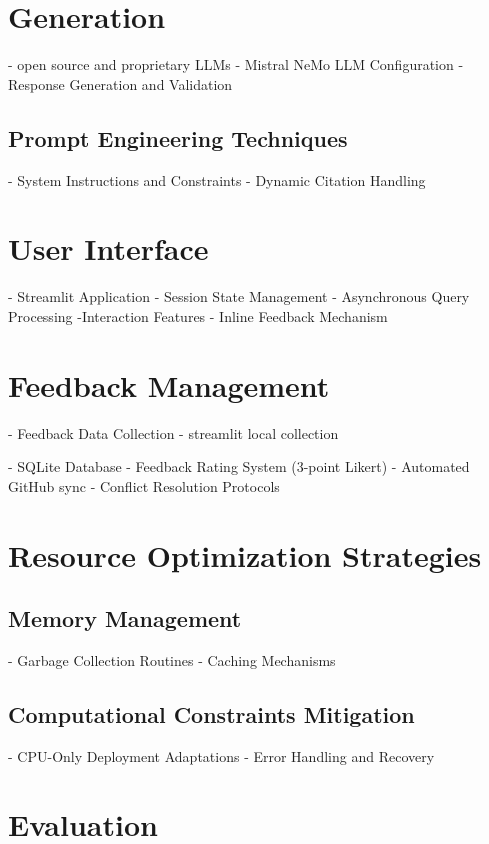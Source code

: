 \begin{spacing}{1.5}
\section{Generation}
- open source and proprietary LLMs \citep{noauthor_open_2025}
      - Mistral NeMo LLM Configuration
      - Response Generation and Validation

      \subsection{Prompt Engineering Techniques}
      - System Instructions and Constraints
      - Dynamic Citation Handling

\section{User Interface}
- Streamlit Application
      - Session State Management
      - Asynchronous Query Processing
-Interaction Features
      - Inline Feedback Mechanism

\section{Feedback Management}
- Feedback Data Collection
- streamlit local collection

      - SQLite Database
      - Feedback Rating System (3-point Likert)
      - Automated GitHub sync
      - Conflict Resolution Protocols

\section{Resource Optimization Strategies}
\subsection{Memory Management}
      - Garbage Collection Routines
      - Caching Mechanisms
\subsection{Computational Constraints Mitigation}
      - CPU-Only Deployment Adaptations
      - Error Handling and Recovery

\section{Evaluation}



\end{spacing}